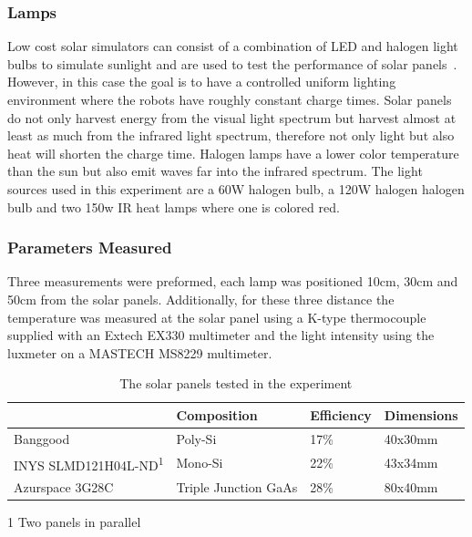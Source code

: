 \subsubsection{Lamps}
Low cost solar simulators can consist of a combination of LED and halogen light bulbs to simulate sunlight and are used to test the performance of solar panels~\cite{grandi_tia_2014}.
However, in this case the goal is to have a controlled uniform lighting environment where the robots have roughly constant charge times.
Solar panels do not only harvest energy from the visual light spectrum but harvest almost at least as much from the infrared light spectrum, therefore not only light but also heat will shorten the charge time.
Halogen lamps have a lower color temperature than the sun but also emit waves far into the infrared spectrum.
The light sources used in this experiment are a 60W halogen bulb, a 120W halogen halogen bulb and two 150w IR heat lamps where one is colored red.

\subsubsection{Parameters Measured}
Three measurements were preformed, each lamp was positioned 10cm, 30cm and 50cm from the solar panels.
Additionally, for these three distance the temperature was measured at the solar panel using a K-type thermocouple supplied with an Extech EX330 multimeter and the light intensity using the luxmeter on a MASTECH MS8229 multimeter.

\begin{table}[t]
	\centering
	\begin{threeparttable}
		\caption{The solar panels tested in the experiment}
		\label{tab:solar_panels}
		\small
		\begin{tabular}{|l|l|l|l|}
			\hline
			& Composition & Efficiency & Dimensions \\
			\hline \hline
			Banggood \cite{bangood_solar_2017}& Poly-Si & 17\% & 40x30mm \\
			\hline
			INYS SLMD121H04L-ND\textsuperscript{1}& Mono-Si & 22\% & 43x34mm \\
			\hline
			Azurspace 3G28C & Triple Junction GaAs& 28\% & 80x40mm \\
			\hline
		\end{tabular}
	\begin{tablenotes}
		\small
		\item [1] Two panels in parallel
	\end{tablenotes}
	\end{threeparttable}
\end{table}

